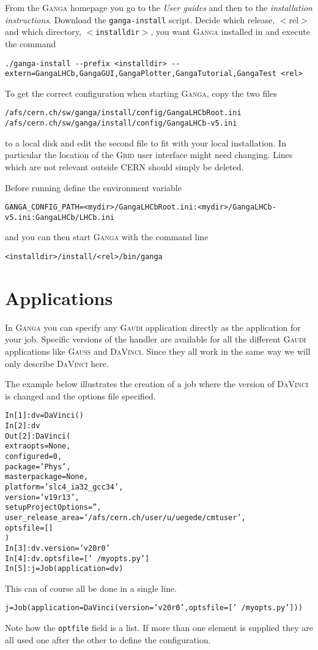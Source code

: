 \documentclass{howto}
\def\ganga {\textsc{Ganga}\xspace}
\def\gaudi {\textsc{Gaudi}\xspace}
\def\davinci {\textsc{DaVinci}\xspace}
\def\gauss {\textsc{Gauss}\xspace}
\def\grid {\textsc{Grid}\xspace}
\def\davinciv {v20r0\xspace}
\begin{document}
From the \ganga homepage you go to the \textit{User guides} and then to the
\textit{installation instructions}. Download the \texttt{ganga-install}
script. Decide which release, $<$rel$>$ and which directory,
\texttt{$<$installdir$>$}, you want \ganga installed in and execute the
command
\begin{verbatim}
./ganga-install --prefix <installdir> --extern=GangaLHCb,GangaGUI,GangaPlotter,GangaTutorial,GangaTest <rel>
\end{verbatim}

To get the correct configuration when starting \ganga, copy the two files
\begin{verbatim}
/afs/cern.ch/sw/ganga/install/config/GangaLHCbRoot.ini
/afs/cern.ch/sw/ganga/install/config/GangaLHCb-v5.ini
\end{verbatim}
to a local disk and edit the second file to fit with your local
installation. In particular the location of the \grid user interface might
need changing. Lines which are not relevant outside CERN should simply be
deleted.

Before running define the environment variable
\begin{verbatim}
GANGA_CONFIG_PATH=<mydir>/GangaLHCbRoot.ini:<mydir>/GangaLHCb-v5.ini:GangaLHCb/LHCb.ini
\end{verbatim}
and you can then start \ganga with the command line
\begin{verbatim}
<installdir>/install/<rel>/bin/ganga
\end{verbatim}

\section{Applications}
\label{sec:gaudi}
In \ganga you can specify any \gaudi application directly as the application
for your job. Specific versions of the handler are available for all the
different \gaudi applications like \gauss and \davinci. Since they all work
in the same way we will only describe \davinci here.

The example below illustrates the creation of a job where the version of
\davinci is changed and the options file specified.
\begin{alltt}
In [1]: dv = DaVinci()
In [2]: dv
Out[2]: DaVinci (
 extraopts = None ,
 configured = 0 ,
 package = 'Phys' ,
 masterpackage = None ,
 platform = 'slc4_ia32_gcc34' ,
 version = 'v19r13' ,
 setupProjectOptions = '',
 user_release_area = '/afs/cern.ch/user/u/uegede/cmtuser' ,
 optsfile = []
 )
In [3]: dv.version='\davinciv'
In [4]: dv.optsfile=['~/myopts.py']
In [5]: j = Job(application=dv)
\end{alltt}
This can of course all be done in a single line.
\begin{alltt}
j = Job(application=DaVinci(version='\davinciv', optsfile=['~/myopts.py']))
\end{alltt}
Note how the \texttt{optfile} field is a list. If more than one element is
supplied they are all used one after the other to define the configuration.
\end{document}
